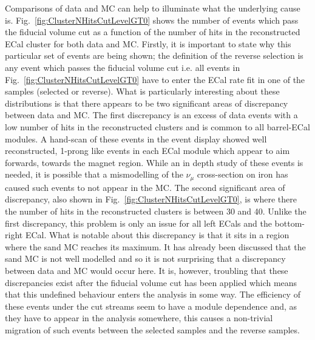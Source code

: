\newline
\newline
Comparisons of data and MC can help to illuminate what the underlying cause is.  Fig.~\ref{fig:ClusterNHitsCutLevelGT0} shows the number of events which pass the fiducial volume cut as a function of the number of hits in the reconstructed ECal cluster for both data and MC.  Firstly, it is important to state why this particular set of events are being shown; the definition of the reverse selection is any event which passes the fiducial volume cut i.e. all events in Fig.~\ref{fig:ClusterNHitsCutLevelGT0} have to enter the ECal rate fit in one of the samples (selected or reverse).  What is particularly interesting about these distributions is that there appears to be two significant areas of discrepancy between data and MC.  The first discrepancy is an excess of data events with a low number of hits in the reconstructed clusters and is common to all barrel-ECal modules.  A hand-scan of these events in the event display showed well reconstructed, 1-prong like events in each ECal module which appear to aim forwards, towards the magnet region.  While an in depth study of these events is needed, it is possible that a mismodelling of the $\nu_\mu$ cross-section on iron has caused such events to not appear in the MC.  The second significant area of discrepancy, also shown in Fig.~\ref{fig:ClusterNHitsCutLevelGT0}, is where there the number of hits in the reconstructed clusters is between 30 and 40.  Unlike the first discrepancy, this problem is only an issue for all left ECals and the bottom-right ECal.  What is notable about this discrepancy is that it sits in a region where the sand MC reaches its maximum.  It has already been discussed that the sand MC is not well modelled and so it is not surprising that a discrepancy between data and MC would occur here.  It is, however, troubling that these discrepancies exist after the fiducial volume cut has been applied which means that this undefined behaviour enters the analysis in some way.  The efficiency of these events under the cut streams seem to have a module dependence and, as they have to appear in the analysis somewhere, this causes a non-trivial migration of such events between the selected samples and the reverse samples.
